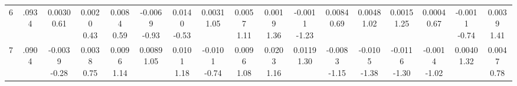 \begin{landscape}
\begin{center}
{\begin{adjustbox}{max width=\textheight}
\begin{tabular}{lcccccccccccccccc}
6 & .0934 & \shortstack{0.0030\\0.61} & \shortstack{0.0020\\0.43} & \shortstack{0.0084\\0.59} & \shortstack{-0.0069\\-0.93} & \shortstack{0.0140\\-0.53} & \shortstack{0.0031\\1.05} & \shortstack{0.0057\\1.11} & \shortstack{0.0019\\1.36} & \shortstack{-0.0011\\-1.23} & \shortstack{0.0084\\0.69} & \shortstack{0.0048\\1.02} & \shortstack{0.0015\\1.25} & \shortstack{0.0004\\0.67} & \shortstack{-0.0011\\-0.74} & \shortstack{0.0039\\1.41} \\
7 & .0904 & \shortstack{-0.0039\\-0.28} & \shortstack{0.0038\\0.75} & \shortstack{0.0096\\1.14} & \shortstack{0.0089\\1.05} & \shortstack{0.0101\\1.18} & \shortstack{-0.0101\\-0.74} & \shortstack{0.0096\\1.08} & \shortstack{0.0203\\1.16} & \shortstack{0.0119\\1.30} & \shortstack{-0.0083\\-1.15} & \shortstack{-0.0105\\-1.38} & \shortstack{-0.0116\\-1.30} & \shortstack{-0.0014\\-1.02} & \shortstack{0.0040\\1.32} & \shortstack{0.0047\\0.78} \\

\end{tabular}
\end{adjustbox}}
\end{center}
\end{landscape}
